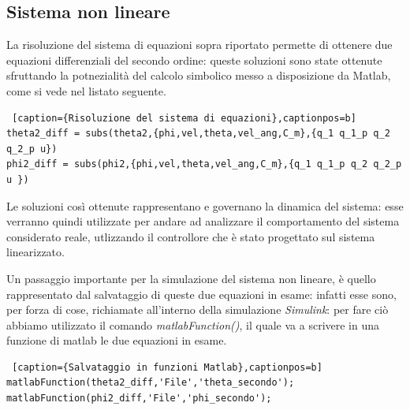 \subsection{Sistema non lineare}
La risoluzione del sistema di equazioni sopra riportato permette di ottenere due equazioni differenziali del secondo ordine: queste soluzioni sono state ottenute sfruttando la potnezialità del calcolo simbolico messo a disposizione da Matlab, come si vede nel listato seguente.

\begin{lstlisting} [caption={Risoluzione del sistema di equazioni},captionpos=b]
theta2_diff = subs(theta2,{phi,vel,theta,vel_ang,C_m},{q_1 q_1_p q_2 q_2_p u})
phi2_diff = subs(phi2,{phi,vel,theta,vel_ang,C_m},{q_1 q_1_p q_2 q_2_p u })
\end{lstlisting}

Le soluzioni così ottenute rappresentano e governano la dinamica del sistema: esse verranno quindi utilizzate per andare ad analizzare il comportamento del sistema considerato reale, utlizzando il controllore che è stato progettato sul sistema linearizzato.

Un passaggio importante per la simulazione del sistema non lineare, è quello rappresentato dal salvataggio di queste due equazioni in esame: infatti esse sono, per forza di cose, richiamate all'interno della simulazione \textit{Simulink}: per fare ciò abbiamo utilizzato il comando \textit{matlabFunction()}, il quale va a scrivere in una funzione di matlab le due equazioni in esame.

\begin{lstlisting} [caption={Salvataggio in funzioni Matlab},captionpos=b]
matlabFunction(theta2_diff,'File','theta_secondo');
matlabFunction(phi2_diff,'File','phi_secondo');
\end{lstlisting}

